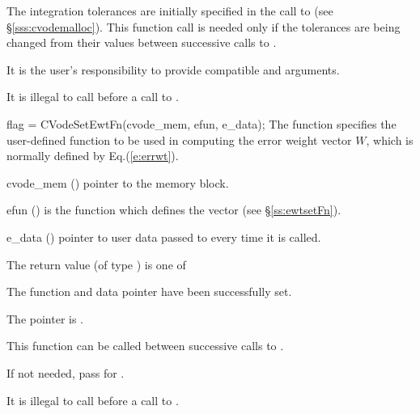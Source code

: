 {
  The integration tolerances are initially specified in the call
  to  (see \S\ref{sss:cvodemalloc}). This function call is
  needed only if the tolerances are being changed from their values between
  successive calls to .

  {\warn}It is the user's responsibility to provide compatible  and
   arguments.

  It is illegal to call  before a call to .
}
{
flag = CVodeSetEwtFn(cvode\_mem, efun, e\_data);
}
{
  The function  specifies the user-defined function
  to be used in computing the error weight vector $W$, which is normally
  defined by Eq.(\ref{e:errwt}).
}
{
  \begin{args}
  \item[cvode\_mem] ()
    pointer to the {\cvode} memory block.
  \item[efun] () 
    is the {\C} function which defines the  vector (see \S\ref{ss:ewtsetFn}).
  \item[e\_data] ()
    pointer to user data passed to  every time it is called.
  \end{args}
}
{
  The return value  (of type ) is one of
  \begin{args}
  \item[\Id{CV\_SUCCESS}] 
    The function  and data pointer  have been successfully set.
  \item[\Id{CV\_MEM\_NULL}]
    The  pointer is .
  \end{args}
}
{
  This function can be called between successive calls to .

  If not needed, pass  for .

  {\warn}It is illegal to call  before a call to .
}

